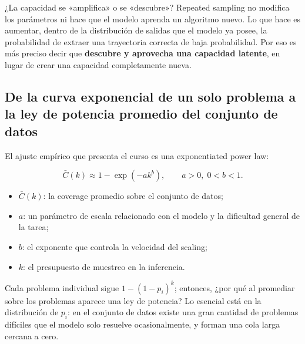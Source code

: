 
\begin{knowledgebox}{¿La capacidad se «amplifica» o se «descubre»?}
Repeated sampling no modifica los parámetros ni hace que el modelo aprenda un algoritmo nuevo. Lo que hace es aumentar, dentro de la distribución de salidas que el modelo ya posee, la probabilidad de extraer una trayectoria correcta de baja probabilidad. Por eso es más preciso decir que \textbf{descubre y aprovecha una capacidad latente}, en lugar de crear una capacidad completamente nueva.
\end{knowledgebox}

\subsection{De la curva exponencial de un solo problema a la ley de potencia promedio del conjunto de datos}

El ajuste empírico que presenta el curso es una exponentiated power law:

$$
\bar C(k)\approx 1-\exp(-a k^b),\qquad a>0,\;0<b<1.
$$

\begin{itemize}
    \item $\bar C(k)$: la coverage promedio sobre el conjunto de datos;
    \item $a$: un parámetro de escala relacionado con el modelo y la dificultad general de la tarea;
    \item $b$: el exponente que controla la velocidad del scaling;
    \item $k$: el presupuesto de muestreo en la inferencia.
\end{itemize}


Cada problema individual sigue $1-(1-p_i)^k$; entonces, ¿por qué al promediar sobre los problemas aparece una ley de potencia? Lo esencial está en la distribución de $p_i$: en el conjunto de datos existe una gran cantidad de problemas difíciles que el modelo solo resuelve ocasionalmente, y forman una cola larga cercana a cero.


